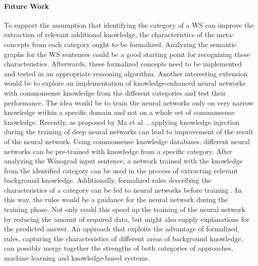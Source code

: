 \paragraph{Future Work}
To support the assumption that identifying the category of a WS can improve the extraction of relevant additional knowledge, the characteristics of the meta-concepts from each category ought to be formalized. Analyzing the semantic graphs for the WS sentences could be a good starting point for recognizing these characteristics. Afterwards, these formalized concepts need to be implemented and tested in an appropriate reasoning algorithm. 
Another interesting extension would be to explore an implementation of knowledge-enhanced neural networks with commonsense knowledge from the different categories and test their performance. The idea would be to train the neural networks only on very narrow knowledge within a specific domain and not on a whole set of commonsense knowledge. Recently, as proposed by Ma et al. \cite{DBLP:conf/aaai/MaPC18}, applying knowledge injection during the training of deep neural networks can lead to improvement of the result of the neural network. Using commonsense knowledge databases, different neural networks can be pre-trained with knowledge from a specific category. After analyzing the Winograd input sentence, a network trained with the knowledge from the identified category can be used in the process of extracting relevant background knowledge. 
Additionally, formalized rules describing the characteristics of a category can be fed to neural networks before training \cite{DBLP:conf/aaai/RoychowdhuryDG18}. In this way, the rules would be a guidance for the neural network during the training phase. Not only could this speed up the training of the neural network by reducing the amount of required data, but might also supply explanations for the predicted answer. An approach that exploits the advantage of formalized rules, capturing the characteristics of different areas of background knowledge, can possibly merge together the strengths of both categories of approaches, machine learning and knowledge-based systems. 
 